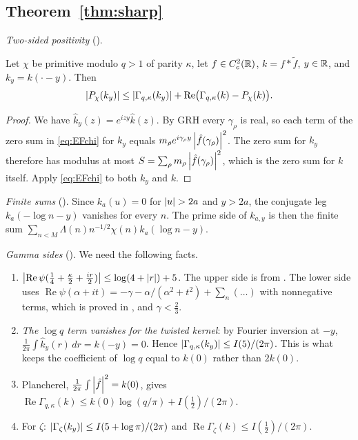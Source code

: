 \subsection{Theorem~\ref{thm:sharp}}
\emph{Two-sided positivity} ().
\begin{lemma}\label{lem:twosided}
Let $\chi$ be primitive modulo $q>1$ of parity $\kappa$, let $f\in C^2_c(\mathbb{R})$, $k=f*\tilde f$, $y\in\mathbb{R}$, and
$k_y=k(\cdot-y)$. Then
\[
  \left\lvert P_\chi(k_y) \right\rvert\le\left\lvert \Gamma_{q,\kappa}(k_y) \right\rvert+\operatorname{Re}\bigl(\Gamma_{q,\kappa}(k)-P_\chi(k)\bigr).
\]
\end{lemma}
\begin{proof}
We have $\hat k_y(z)=e^{izy}\hat k(z)$. By GRH every $\gamma_\rho$ is real, so each term of the zero sum
in \eqref{eq:EFchi} for $k_y$ equals $m_\rho e^{i\gamma_\rho y}\left\lvert \hat f(\gamma_\rho) \right\rvert^2$. The zero sum
for $k_y$ therefore has modulus at most $S=\sum_\rho m_\rho\left\lvert \hat f(\gamma_\rho) \right\rvert^2$, which is the
zero sum for $k$ itself. Apply \eqref{eq:EFchi} to both $k_y$ and $k$.
\end{proof}

\emph{Finite sums} (). Since $k_a(u)=0$ for $\left\lvert u \right\rvert>2a$ and $y>2a$, the conjugate
leg $k_a(-\log n-y)$ vanishes for every $n$. The prime side of $k_{a,y}$ is then the finite sum
$\sum_{n<M}\Lambda(n)n^{-1/2}\chi(n)k_a(\log n-y)$.

\emph{Gamma sides} (). We need the following facts.
\begin{enumerate}
\item $\left\lvert \operatorname{Re}\psi(\frac14+\frac\kappa2+\frac{ir}2) \right\rvert\le\log(4+\left\lvert r \right\rvert)+5$. The upper side is from
  \cite{grhmiller}. The lower side uses $\operatorname{Re}\psi(\alpha+it)=-\gamma-\alpha/(\alpha^2+t^2)+\sum_n(\ldots)$ with
  nonnegative terms, which is proved in \cite{zeta23}, and $\gamma<\frac23$.
\item \emph{The $\log q$ term vanishes for the twisted kernel}: by Fourier inversion at $-y$,
  $\frac1{2\pi}\int\hat k_y(r)\,dr=k(-y)=0$. Hence $\left\lvert \Gamma_{q,\kappa}(k_y) \right\rvert\le I(5)/(2\pi)$. This is what keeps the
  coefficient of $\log q$ equal to $k(0)$ rather than $2k(0)$.
\item Plancherel, $\frac1{2\pi}\int\left\lvert \hat f \right\rvert^2=k(0)$, gives
  $\operatorname{Re}\Gamma_{q,\kappa}(k)\le k(0)\log(q/\pi)+I(\frac12)/(2\pi)$.
\item For $\zeta$: $\left\lvert \Gamma_\zeta(k_y) \right\rvert\le I(5+\log\pi)/(2\pi)$ and $\operatorname{Re}\Gamma_\zeta(k)\le I(\frac12)/(2\pi)$.
\end{enumerate}

